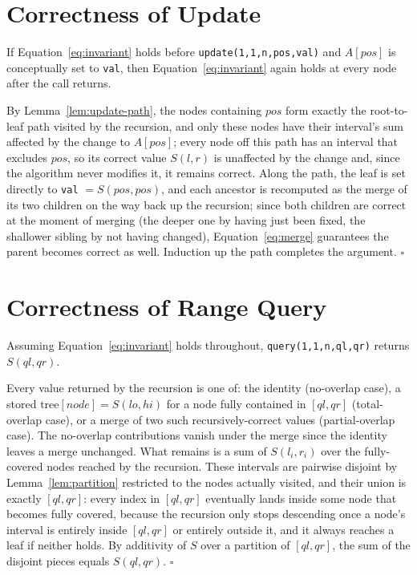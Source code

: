 \documentclass[
  11pt,
  a4paper,
  twoside=false,
  numbers=noenddot,
  headings=big,
  parskip=half,
  toc=bibliography,
  toc=listof,
  bibliography=totoc
]{scrreprt}
\newenvironment{proof}[1][Proof]{\par\noindent{\bfseries\sffamily\color{navy}#1.}\enspace}{\hfill$\square$\par\medskip}
\begin{document}
\section{Correctness of Update}
\begin{thm}\label{thm:update-correct}
If Equation~\eqref{eq:invariant} holds before \texttt{update(1,1,n,pos,val)} and $A[pos]$ is conceptually set to \texttt{val}, then Equation~\eqref{eq:invariant} again holds at every node after the call returns.
\end{thm}
\begin{proof}
By Lemma~\ref{lem:update-path}, the nodes containing $pos$ form exactly the root-to-leaf path visited by the recursion, and only these nodes have their interval's sum affected by the change to $A[pos]$; every node off this path has an interval that excludes $pos$, so its correct value $S(l,r)$ is unaffected by the change and, since the algorithm never modifies it, it remains correct. Along the path, the leaf is set directly to \texttt{val} $=S(pos,pos)$, and each ancestor is recomputed as the merge of its two children on the way back up the recursion; since both children are correct at the moment of merging (the deeper one by having just been fixed, the shallower sibling by not having changed), Equation~\eqref{eq:merge} guarantees the parent becomes correct as well. Induction up the path completes the argument.
\end{proof}

\section{Correctness of Range Query}
\begin{thm}\label{thm:query-correct}
Assuming Equation~\eqref{eq:invariant} holds throughout, \texttt{query(1,1,n,ql,qr)} returns $S(ql,qr)$.
\end{thm}
\begin{proof}
Every value returned by the recursion is one of: the identity (no-overlap case), a stored $\text{tree}[node]=S(lo,hi)$ for a node fully contained in $[ql,qr]$ (total-overlap case), or a merge of two such recursively-correct values (partial-overlap case). The no-overlap contributions vanish under the merge since the identity leaves a merge unchanged. What remains is a sum of $S(l_i,r_i)$ over the fully-covered nodes reached by the recursion. These intervals are pairwise disjoint by Lemma~\ref{lem:partition} restricted to the nodes actually visited, and their union is exactly $[ql,qr]$: every index in $[ql,qr]$ eventually lands inside some node that becomes fully covered, because the recursion only stops descending once a node's interval is entirely inside $[ql,qr]$ or entirely outside it, and it always reaches a leaf if neither holds. By additivity of $S$ over a partition of $[ql,qr]$, the sum of the disjoint pieces equals $S(ql,qr)$.
\end{proof}
\end{document}
